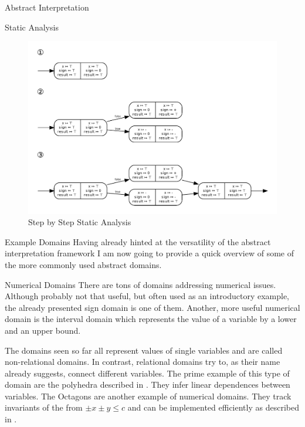 \begin{chapter}{Abstract Interpretation}
\begin{section}{Static Analysis}
\begin{example}
			\begin{figure}[t]
				\centering
				\includegraphics[width=\textwidth]{Graphs/StaticAnalysis.pdf}
				\caption{Step by Step Static Analysis}
				\label{figure:staticanalysis}
			\end{figure}
		\end{example}

	\end{section}

	\begin{section}{Example Domains}
		Having already hinted at the versatility of the abstract interpretation framework I am now going to provide a quick overview of some of the more commonly used abstract domains.

		\begin{subsection}{Numerical Domains}
			There are tons of domains addressing numerical issues. Although probably not that useful, but often used as an introductory example, the already presented sign domain is one of them. Another, more useful numerical domain is the interval domain which represents the value of a variable by a lower and an upper bound.

			The domains seen so far all represent values of single variables and are called non-relational domains. In contrast, relational domains try to, as their name already suggests, connect different variables. The prime example of this type of domain are the polyhedra described in \cite{cousot78}. They infer linear dependences between variables. The Octagons are another example of numerical domains. They track invariants of the from $\pm x \pm y \leq c$ and can be implemented efficiently as described in \cite{mine06}.
		\end{subsection}


\end{section}
\end{chapter}
